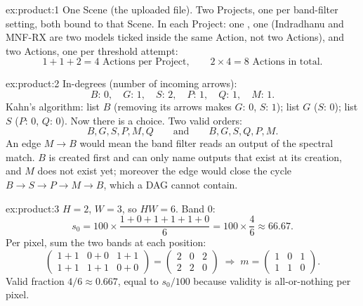 
\begin{solution}{ex:product:1}
One Scene (the uploaded file). Two Projects, one per band-filter setting, both bound to that Scene.
In each Project: one , one  (Indradhanu and
MNF-RX are two models ticked inside the same Action, not two Actions), and two
 Actions, one per threshold attempt:
\[ 1 + 1 + 2 = 4 \text{ Actions per Project}, \qquad 2 \times 4 = 8 \text{ Actions in total.} \]
\end{solution}

\begin{solution}{ex:product:2}
In-degrees (number of incoming arrows):
\[ B{:}\,0,\quad G{:}\,1,\quad S{:}\,2,\quad P{:}\,1,\quad Q{:}\,1,\quad M{:}\,1. \]
Kahn's algorithm: list $B$ (removing its arrows makes $G{:}\,0$, $S{:}\,1$); list $G$ ($S{:}\,0$);
list $S$ ($P{:}\,0$, $Q{:}\,0$). Now there is a choice. Two valid orders:
\[ B, G, S, P, M, Q \qquad\text{and}\qquad B, G, S, Q, P, M. \]
An edge $M \to B$ would mean the band filter reads an output of the spectral match. $B$ is created
first and can only name outputs that exist at its creation, and $M$ does not exist yet; moreover the
edge would close the cycle $B \to S \to P \to M \to B$, which a DAG cannot contain.
\end{solution}

\begin{solution}{ex:product:3}
$H = 2$, $W = 3$, so $HW = 6$. Band $0$:
\[ s_0 = 100 \times \frac{1 + 0 + 1 + 1 + 1 + 0}{6} = 100 \times \frac{4}{6} \approx 66.67. \]
Per pixel, sum the two bands at each position:
\[
\begin{pmatrix}1+1 & 0+0 & 1+1\\ 1+1 & 1+1 & 0+0\end{pmatrix}
= \begin{pmatrix}2&0&2\\2&2&0\end{pmatrix}
\;\Rightarrow\;
m = \begin{pmatrix}1&0&1\\1&1&0\end{pmatrix}.
\]
Valid fraction $4/6 \approx 0.667$, equal to $s_0/100$ because validity is all-or-nothing per pixel.
\end{solution}

